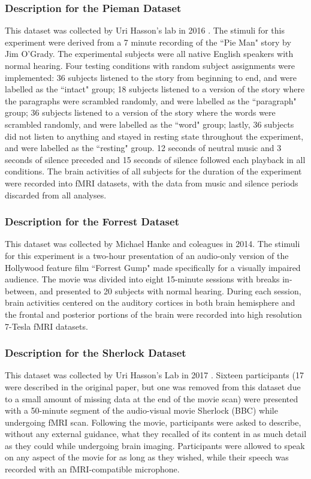 \documentclass[11pt]{article}
\begin{document}
\begin{enumerate}
\subsubsection{Description for the Pieman Dataset}
This dataset was collected by Uri Hasson's lab in 2016 \citep{hasson2016}. The stimuli for this experiment were derived from a 7 minute recording of the ``Pie Man" story by Jim O'Grady. The experimental subjects were all native English speakers with normal hearing. Four testing conditions with random subject assignments were implemented: 36 subjects listened to the story from beginning to end, and were labelled as the ``intact" group; 18 subjects listened to a version of the story where the paragraphs were scrambled randomly, and were labelled as the ``paragraph" group; 36 subjects listened to a version of the story where the words were scrambled randomly, and were labelled as the ``word" group; lastly, 36 subjects did not listen to anything and stayed in resting state throughout the experiment, and were labelled as the ``resting" group. 12 seconds of neutral music and 3 seconds of silence preceded and 15 seconds of silence followed each playback in all conditions. The brain activities of all subjects for the duration of the experiment were recorded into fMRI datasets, with the data from music and silence periods discarded from all analyses.

\subsubsection{Description for the Forrest Dataset}
This dataset was collected by Michael Hanke and coleagues in 2014\citep{Hanke2014}. The stimuli for this experiment is a two-hour presentation of an audio-only version of the Hollywood feature film ``Forrest Gump" made specifically for a visually impaired audience. The movie was divided into eight 15-minute sessions with breaks in-between, and presented to 20 subjects with normal hearing. During each session, brain activities centered on the auditory cortices in both brain hemisphere and the frontal and posterior portions of the brain were recorded into high resolution 7-Tesla fMRI datasets.

\subsubsection{Description for the Sherlock Dataset}
This dataset was collected by Uri Hasson's Lab in 2017 \citep{Chen2017}. Sixteen participants (17 were described in the original paper, but one was removed from this dataset due to a small amount of missing data at the end of the movie scan) were presented with a 50-minute segment of the audio-visual movie Sherlock (BBC) while undergoing fMRI scan. Following the movie, participants were asked to describe, without any external guidance, what they recalled of its content in as much detail as they could while undergoing brain imaging. Participants were allowed to speak on any aspect of the movie for as long as they wished, while their speech was recorded with an fMRI-compatible microphone.


\end{enumerate}
\end{document}
